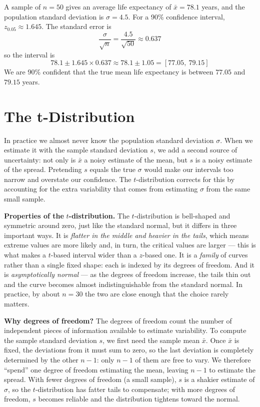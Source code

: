 \documentclass[
  11pt,
  letterpaper,
  DIV=11,
  numbers=noendperiod,
  oneside,
  open=any]{scrreprt}
\begin{document}
\begin{bsexample}[Example]

A sample of \(n = 50\) gives an average life expectancy of
\(\bar{x} = 78.1\) years, and the population standard deviation is
\(\sigma = 4.5\). For a 90\% confidence interval,
\(z_{0.05} \approx 1.645\). The standard error is
\[\frac{\sigma}{\sqrt{n}} = \frac{4.5}{\sqrt{50}} \approx 0.637\] so the
interval is
\[78.1 \pm 1.645 \times 0.637 \approx 78.1 \pm 1.05 = [77.05,\ 79.15]\]
We are 90\% confident that the true mean life expectancy is between
\(77.05\) and \(79.15\) years.

\end{bsexample}

\section{The t-Distribution}\label{the-t-distribution}

In practice we almost never know the population standard deviation
\(\sigma\). When we estimate it with the sample standard deviation
\(s\), we add a second source of uncertainty: not only is \(\bar{x}\) a
noisy estimate of the mean, but \(s\) is a noisy estimate of the spread.
Pretending \(s\) equals the true \(\sigma\) would make our intervals too
narrow and overstate our confidence. The \(t\)-distribution corrects for
this by accounting for the extra variability that comes from estimating
\(\sigma\) from the same small sample.

\textbf{Properties of the} \(t\)\textbf{-distribution.} The
\(t\)-distribution is bell-shaped and symmetric around zero, just like
the standard normal, but it differs in three important ways. It is
\emph{flatter in the middle and heavier in the tails}, which means
extreme values are more likely and, in turn, the critical values are
larger --- this is what makes a \(t\)-based interval wider than a
\(z\)-based one. It is a \emph{family} of curves rather than a single
fixed shape: each is indexed by its degrees of freedom. And it is
\emph{asymptotically normal} --- as the degrees of freedom increase, the
tails thin out and the curve becomes almost indistinguishable from the
standard normal. In practice, by about \(n = 30\) the two are close
enough that the choice rarely matters.

\textbf{Why degrees of freedom?} The degrees of freedom count the number
of independent pieces of information available to estimate variability.
To compute the sample standard deviation \(s\), we first need the sample
mean \(\bar{x}\). Once \(\bar{x}\) is fixed, the deviations from it must
sum to zero, so the last deviation is completely determined by the other
\(n - 1\): only \(n - 1\) of them are free to vary. We therefore
``spend'' one degree of freedom estimating the mean, leaving \(n - 1\)
to estimate the spread. With fewer degrees of freedom (a small sample),
\(s\) is a shakier estimate of \(\sigma\), so the \(t\)-distribution has
fatter tails to compensate; with more degrees of freedom, \(s\) becomes
reliable and the distribution tightens toward the normal.
\end{document}
